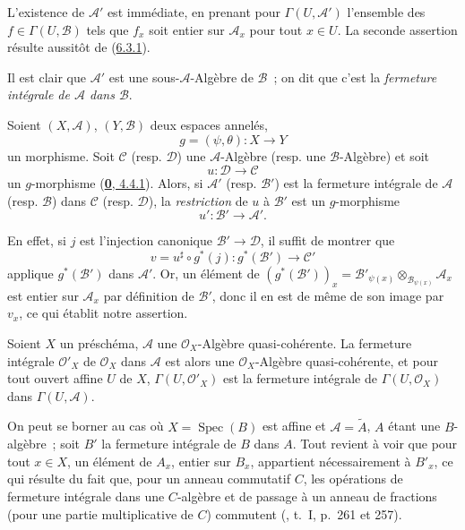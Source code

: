 L'existence de $\mathcal{A}'$ est immédiate, en prenant pour
$\Gamma(U,\mathcal{A}')$ l'ensemble des $f\in\Gamma(U,\mathcal{B})$ tels que
$f_x$ soit entier sur $\mathcal{A}_x$ pour tout $x\in U$. La seconde
assertion résulte aussitôt de (\hyperref[II.6.3.1-fr]{6.3.1}).

Il est clair que $\mathcal{A}'$ est une sous-$\mathcal{A}$-Algèbre de
$\mathcal{B}$~; on dit que c'est la \emph{fermeture intégrale de
$\mathcal{A}$ dans $\mathcal{B}$}.

\begin{env}[6.3.3]
\label{II.6.3.3-fr}
Soient $(X,\mathcal{A})$, $(Y,\mathcal{B})$ deux espaces annelés,
\[
g=(\psi,\theta):X\to Y
\]
un morphisme. Soit $\mathcal{C}$ (resp. $\mathcal{D}$) une
$\mathcal{A}$-Algèbre (resp. une $\mathcal{B}$-Algèbre) et soit
\[
u:\mathcal{D}\to\mathcal{C}
\]
un $g$-morphisme (\hyperref[0.4.4.1-fr]{\textbf{0}, 4.4.1}). Alors, si
$\mathcal{A}'$ (resp. $\mathcal{B}'$) est la fermeture intégrale de
$\mathcal{A}$ (resp. $\mathcal{B}$) dans $\mathcal{C}$ (resp.
$\mathcal{D}$), la \emph{restriction} de $u$ à $\mathcal{B}'$ est un
$g$-morphisme
\[
u':\mathcal{B}'\to\mathcal{A}'.
\]

En effet, si $j$ est l'injection canonique $\mathcal{B}'\to\mathcal{D}$, il
suffit de montrer que
\[
v=u^\sharp\circ g^*(j):g^*(\mathcal{B}')\to\mathcal{C}'
\]
applique $g^*(\mathcal{B}')$ dans $\mathcal{A}'$. Or, un élément de
$(g^*(\mathcal{B}'))_x=\mathcal{B}'_{\psi(x)}\otimes_{\mathcal{B}_{\psi(x)}}
\mathcal{A}_x$ est entier sur $\mathcal{A}_x$ par définition de
$\mathcal{B}'$, donc il en est de même de son image par $v_x$, ce qui établit
notre assertion.
\end{env}

\begin{proposition}[6.3.4]
\label{II.6.3.4-fr}
Soient $X$ un préschéma, $\mathcal{A}$ une $\mathcal{O}_X$-Algèbre
quasi-cohérente. La fermeture intégrale $\mathcal{O}'_X$ de
$\mathcal{O}_X$ dans $\mathcal{A}$ est alors une $\mathcal{O}_X$-Algèbre
quasi-cohérente, et pour tout ouvert affine $U$ de $X$,
$\Gamma(U,\mathcal{O}'_X)$ est la fermeture intégrale de
$\Gamma(U,\mathcal{O}_X)$ dans $\Gamma(U,\mathcal{A})$.
\end{proposition}

On peut se borner au cas où $X=\operatorname{Spec}(B)$ est affine et
$\mathcal{A}=\widetilde{A}$, $A$ étant une
$B$-algèbre~; soit $B'$ la fermeture intégrale de $B$ dans $A$. Tout revient
à voir que pour tout $x\in X$, un élément de $A_x$, entier sur $B_x$,
appartient nécessairement à $B'_x$, ce qui résulte du fait que, pour un anneau
commutatif $C$, les opérations de fermeture intégrale dans une $C$-algèbre et
de passage à un anneau de fractions (pour une partie multiplicative de $C$)
commutent (\cite{I-13}, t.~I, p.~261 et 257).

